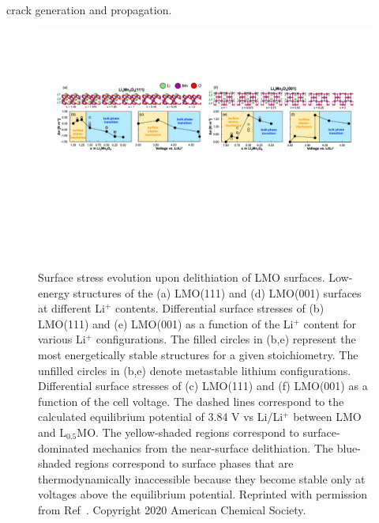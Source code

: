 \documentclass[../main.tex]{subfiles}
\begin{document}
crack generation and propagation. \cite{liang2018ab}

\begin{figure}
    \centering
    \includegraphics[scale=0.6]{figures/cathode_surface_stress.pdf}
    \caption{Surface stress evolution upon delithiation of LMO surfaces. Low-energy structures of the (a) LMO(111) and (d) LMO(001) surfaces at different Li$^+$ contents. Differential surface stresses of (b) LMO(111) and (e) LMO(001) as a function of the Li$^+$ content for various Li$^+$ configurations. The filled circles in (b,e) represent the most energetically stable structures for a given stoichiometry. The unfilled circles in (b,e) denote metastable lithium configurations. Differential surface stresses of (c) LMO(111) and (f) LMO(001) as a function of the cell voltage. The dashed lines correspond to the calculated equilibrium potential of 3.84 V vs Li/Li$^+$ between LMO and L$_{0.5}$MO. The yellow-shaded regions correspond to surface-dominated mechanics from the near-surface delithiation. The blue-shaded regions correspond to surface phases that are thermodynamically inaccessible because they become stable only at voltages above the equilibrium potential. Reprinted with permission from Ref~\cite{warburton2020oriented}. Copyright 2020 American Chemical Society.}
    \label{fig:cathode_surface_stress}
\end{figure}
\end{document}
